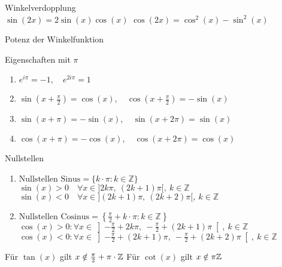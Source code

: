 \begin{corollary}{Winkelverdopplung}\\
        $\sin(2x) = 2 \sin(x)\cos(x)$ \hspace{4mm} $\cos(2x) = \cos^2(x) - \sin^2(x)$
\end{corollary}

\begin{corollary}{Potenz der Winkelfunktion}\\
\end{corollary}

\begin{corollary}{Eigenschaften mit $\pi$}
    \begin{enumerate}[itemsep= 2pt]
        \item $e^{i\pi} = -1, \quad e^{2i\pi} = 1$
        \item $\sin\left(x + \frac{\pi}{2}\right) = \cos(x), \quad \cos\left(x + \frac{\pi}{2}\right) = -\sin(x)$
        \item $\sin(x+\pi) = -\sin (x), \quad \sin(x + 2\pi) = \sin(x)$
        \item $\cos(x+\pi) = -\cos (x), \quad \cos(x + 2\pi) = \cos(x)$
    \end{enumerate}
\end{corollary}

\begin{corollary}{Nullstellen}
    \begin{enumerate}
         \item $\text{Nullstellen Sinus} = \{k\cdot \pi : k\in \mathbb{Z}\}$\\
        $\sin(x) > 0 \quad \forall x \in ]2k\pi, ~(2k+1)\pi[, ~ k\in \mathbb{Z}$\\[2pt]
        $\sin(x) < 0 \quad \forall x \in ](2k + 1)\pi, ~(2k+2)\pi[, ~ k\in \mathbb{Z}$
        \item $\text{Nullstellen Cosinus} = \left\{\frac{\pi}{2}+k\cdot \pi : k\in \mathbb{Z}\right\}$\\
        $\cos(x) > 0:\forall x \in \left]-\frac{\pi}{2} +2k\pi, ~-\frac{\pi}{2} +(2k+1)\pi\right[, ~ k\in \mathbb{Z}$\\[2pt]
        $\cos(x) < 0:\forall x \in \left]-\frac{\pi}{2} + (2k + 1)\pi, ~-\frac{\pi}{2} +(2k+2)\pi\right[, ~ k\in \mathbb{Z}$
    \end{enumerate}
\end{corollary}

\noindent Für $\tan(x)$ gilt $x \notin \frac{\pi}{2} + \pi \cdot \mathbb{Z}$ \qquad Für $\cot(x)$ gilt $x \notin \pi \mathbb{Z}$

